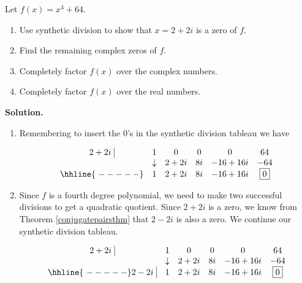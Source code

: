 \begin{ex}  Let $f(x) = x^4+64$.  

\begin{enumerate}

\item  Use synthetic division to show that $x=2+2i$ is a zero of $f$.

\item  Find the remaining complex zeros of $f$.

\item  Completely factor $f(x)$ over the complex numbers.

\item  Completely factor $f(x)$ over the real numbers.

\end{enumerate}

{ \bf Solution.}

\begin{enumerate}

\item  Remembering to insert the $0$'s in the synthetic division tableau we have

\[ \begin{array}{cccccc}
 2+2i \, \, \vline& 1 & 0 & 0  & 0 & 64 \\

  & \downarrow     &  2+2i  &  8i & -16+16i & -64\\ \hhline{~-----} 
  
               & 1 &  2+2i  & 8i & -16+16i &  \fbox{$0$}  \\ \end{array}\]



\item  Since $f$ is a fourth degree polynomial, we need to make two successful divisions to get a quadratic quotient.  Since $2+2i$ is a zero, we know from Theorem \ref{conjugatepairsthm} that $2-2i$ is also a zero.  We continue our synthetic division tableau.

\[ \begin{array}{cccccc}
  2+2i \, \, \vline& 1 & 0 & 0  & 0 & 64 \\

  & \downarrow     &  2+2i  &  8i & -16+16i & -64\\ \hhline{~-----} 
  
  2-2i \, \, \vline  & 1 &  2+2i  & 8i & -16+16i &  \fbox{$0$}  \\
    

\end{array}\]
\end{enumerate}
\end{ex}
